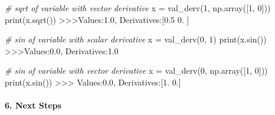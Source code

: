 \documentclass[11pt]{article}
\newenvironment{Shaded}{}{}
\newcommand{\DecValTok}[1]{\textcolor[rgb]{0.25,0.63,0.44}{{#1}}}
\newcommand{\FloatTok}[1]{\textcolor[rgb]{0.25,0.63,0.44}{{#1}}}
\newcommand{\CommentTok}[1]{\textcolor[rgb]{0.38,0.63,0.69}{\textit{{#1}}}}
\newcommand{\NormalTok}[1]{{#1}}
\newcommand{\OperatorTok}[1]{\textcolor[rgb]{0.40,0.40,0.40}{{#1}}}
\newcommand{\BuiltInTok}[1]{{#1}}
\begin{document}
\begin{Shaded}
\begin{Highlighting}[]
\CommentTok{# sqrt of variable with vector derivative}
\NormalTok{x }\OperatorTok{=}\NormalTok{ val_derv(}\DecValTok{1}\NormalTok{, np.array([}\DecValTok{1}\NormalTok{, }\DecValTok{0}\NormalTok{]))}
\BuiltInTok{print}\NormalTok{(x.sqrt())}
\OperatorTok{>>>}\NormalTok{Values:}\FloatTok{1.0}\NormalTok{, Derivatives:[}\FloatTok{0.5} \FloatTok{0.}\NormalTok{ ]}
\end{Highlighting}
\end{Shaded}

\begin{Shaded}
\begin{Highlighting}[]
\CommentTok{# sin of variable with scalar derivative}
\NormalTok{x }\OperatorTok{=}\NormalTok{ val_derv(}\DecValTok{0}\NormalTok{, }\DecValTok{1}\NormalTok{)}
\BuiltInTok{print}\NormalTok{(x.sin())}
\OperatorTok{>>>}\NormalTok{Values:}\FloatTok{0.0}\NormalTok{, Derivatives:}\FloatTok{1.0}
\end{Highlighting}
\end{Shaded}

\begin{Shaded}
\begin{Highlighting}[]
\CommentTok{# sin of variable with vector derivative}
\NormalTok{x }\OperatorTok{=}\NormalTok{ val_derv(}\DecValTok{0}\NormalTok{, np.array([}\DecValTok{1}\NormalTok{, }\DecValTok{0}\NormalTok{]))}
\BuiltInTok{print}\NormalTok{(x.sin())}
\OperatorTok{>>>}\NormalTok{ Values:}\FloatTok{0.0}\NormalTok{, Derivatives:[}\FloatTok{1.} \FloatTok{0.}\NormalTok{]}
\end{Highlighting}
\end{Shaded}

\hypertarget{next-steps}{%
\paragraph{\texorpdfstring{6. \textbf{Next
Steps}}{6. Next Steps}}\label{next-steps}}
\end{document}
